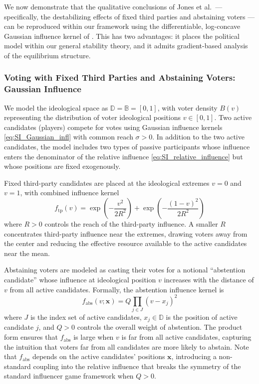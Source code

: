\documentclass{article}
\begin{document}
        We now demonstrate that the qualitative conclusions of Jones et al.\ --- specifically, the destabilizing effects of fixed third parties and abstaining voters --- can be reproduced within our framework using the differentiable, log-concave Gaussian influence kernel of .
        This has two advantages: it places the political model within our general stability theory, and it admits gradient-based analysis of the equilibrium structure.

    \subsubsection{Voting with Fixed Third Parties and Abstaining Voters: Gaussian Influence}\label{subsubsec:SI_voting_gaussian}

        We model the ideological space as $\mathbb{D} = \mathbb{B} = [0,1]$, with voter density $B(v)$ representing the distribution of voter ideological positions $v \in [0,1]$.
        Two active candidates (players) compete for votes using Gaussian influence kernels \cref{eq:SI_Gaussian_infl} with common reach $\sigma > 0$.
        In addition to the two active candidates, the model includes two types of passive participants whose influence enters the denominator of the relative influence \cref{eq:SI_relative_influence} but whose positions are fixed exogenously.

        Fixed third-party candidates are placed at the ideological extremes $v = 0$ and $v = 1$, with combined influence kernel
        \begin{equation}
            \label{eq:SI_third_party_kernel}
            f_{\mathrm{tp}}(v)
            = \exp\!\left(-\frac{v^2}{2R^2}\right)
            + \exp\!\left(-\frac{(1-v)^2}{2R^2}\right)
        \end{equation}
        where $R > 0$ controls the reach of the third-party influence.
        A smaller $R$ concentrates third-party influence near the extremes, drawing voters away from the center and reducing the effective resource available to the active candidates near the mean.


        Abstaining voters are modeled as casting their votes for a notional ``abstention candidate'' whose influence at ideological position $v$ increases with the distance of $v$ from all active candidates.
        Formally, the abstention influence kernel is
        \begin{equation}
            \label{eq:pp_abstain_1d}
            f_{\mathrm{abs}}(v;\mathbf{x}) = Q \prod_{j \in J}(v - x_j)^2
        \end{equation}
        where $J$ is the index set of active candidates, $x_j \in \mathbb{D}$ is the position of active candidate $j$, and $Q > 0$ controls the overall weight of abstention.
        The product form ensures that $f_{\mathrm{abs}}$ is large when $v$ is far from all active candidates, capturing the intuition that voters far from all candidates are more likely to abstain.
        Note that $f_{\mathrm{abs}}$ depends on the active candidates' positions $\mathbf{x}$, introducing a non-standard coupling into the relative influence that breaks the symmetry of the standard influencer game framework when $Q > 0$.
\end{document}
